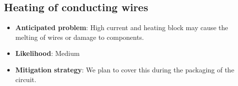\documentclass[12pt]{article}
\begin{document}
\subsection{Heating of conducting wires}
\begin{itemize}
    \item 
\textbf{Anticipated problem}: High current and heating block may cause the melting of wires or damage to components.
\item \textbf{Likelihood}: Medium
\item \textbf{Mitigation strategy}: We plan to cover this during the packaging of the circuit.
\end{itemize}
\end{document}
